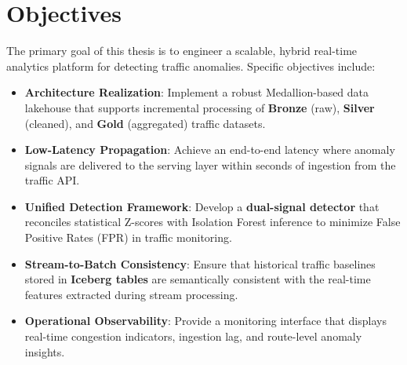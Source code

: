 \section{Objectives}

The primary goal of this thesis is to engineer a scalable, hybrid real-time analytics platform for detecting traffic anomalies. Specific objectives include:

\begin{itemize}
\item \textbf{Architecture Realization}: Implement a robust Medallion-based data lakehouse that supports incremental processing of \textbf{Bronze} (raw), \textbf{Silver} (cleaned), and \textbf{Gold} (aggregated) traffic datasets.
\item \textbf{Low-Latency Propagation}: Achieve an end-to-end latency where anomaly signals are delivered to the serving layer within seconds of ingestion from the traffic API.
\item \textbf{Unified Detection Framework}: Develop a \textbf{dual-signal detector} that reconciles statistical Z-scores with Isolation Forest inference to minimize False Positive Rates (FPR) in traffic monitoring.
\item \textbf{Stream-to-Batch Consistency}: Ensure that historical traffic baselines stored in \textbf{Iceberg tables} are semantically consistent with the real-time features extracted during stream processing.
\item \textbf{Operational Observability}: Provide a monitoring interface that displays real-time congestion indicators, ingestion lag, and route-level anomaly insights.
\end{itemize}